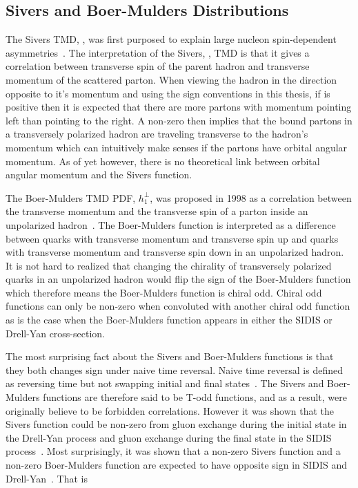 \subsection{Sivers and Boer-Mulders Distributions}
The Sivers TMD, {\siv}, was first purposed to explain large nucleon
spin-dependent asymmetries~\cite{Sivers}.  The interpretation of the Sivers,
{\siv}, TMD is that it gives a correlation between transverse spin of the parent
hadron and transverse momentum of the scattered parton.  When viewing the hadron
in the direction opposite to it's momentum and using the sign conventions in
this thesis, if {\siv} is positive then it is expected that there are more
partons with momentum pointing left than pointing to the right.  A non-zero
{\siv} then implies that the bound partons in a transversely polarized hadron
are traveling transverse to the hadron's momentum which can intuitively make
senses if the partons have orbital angular momentum.  As of yet however, there
is no theoretical link between orbital angular momentum and the Sivers function.

The Boer-Mulders TMD PDF, $h_1^{\perp}$, was proposed in 1998 as a correlation
between the transverse momentum and the transverse spin of a parton inside an
unpolarized hadron~\cite{Boer:1997nt}.  The Boer-Mulders function is interpreted
as a difference between quarks with transverse momentum and transverse spin up
and quarks with transverse momentum and transverse spin down in an unpolarized
hadron.  It is not hard to realized that changing the chirality of transversely
polarized quarks in an unpolarized hadron would flip the sign of the
Boer-Mulders function which therefore means the Boer-Mulders function is chiral
odd.  Chiral odd functions can only be non-zero when convoluted with another
chiral odd function as is the case when the Boer-Mulders function appears in
either the SIDIS or Drell-Yan cross-section.

The most surprising fact about the Sivers and Boer-Mulders functions is that
they both changes sign under naive time reversal.  Naive time reversal is
defined as reversing time but not swapping initial and final
states~\cite{Bacchetta:2006tn}.  The Sivers and Boer-Mulders functions are
therefore said to be T-odd functions, and as a result, were originally believe
to be forbidden correlations.  However it was shown that the Sivers function
could be non-zero from gluon exchange during the initial state in the Drell-Yan
process and gluon exchange during the final state in the SIDIS
process~\cite{Brodsky:2002cx,Brodsky:2002rv}.  Most surprisingly, it was shown
that a non-zero Sivers function and a non-zero Boer-Mulders function are
expected to have opposite sign in SIDIS and Drell-Yan~\cite{collins_2002}.  That
is

